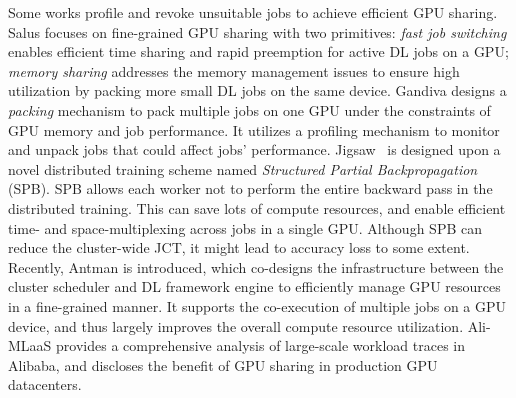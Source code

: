 Some works profile and revoke unsuitable jobs to achieve efficient GPU sharing. Salus \cite{Salus} focuses on fine-grained GPU sharing with two primitives: \emph{fast job switching} enables efficient time sharing and rapid preemption for active DL jobs on a GPU; \emph{memory sharing} addresses the memory management issues to ensure high utilization by packing more small DL jobs on the same device. Gandiva \cite{Gandiva} designs a \emph{packing} mechanism to pack multiple jobs on one GPU under the constraints of GPU memory and job performance. It utilizes a profiling mechanism to monitor and unpack jobs that could affect jobs’ performance. Jigsaw~\cite{JIGSAW} is designed upon a novel distributed training scheme named \emph{Structured Partial Backpropagation} (SPB). SPB allows each worker not to perform the entire backward pass in the distributed training. This can save lots of compute resources, and enable efficient time- and space-multiplexing across jobs in a single GPU.
Although SPB can reduce the cluster-wide JCT, it might lead to accuracy loss to some extent. Recently, Antman \cite{Antman} is introduced, which co-designs the infrastructure between the cluster scheduler and DL framework engine to efficiently manage GPU resources in a fine-grained manner. It supports the co-execution of multiple jobs on a GPU device, and thus largely improves the overall compute resource utilization. Ali-MLaaS \cite{MLaaS} provides a comprehensive analysis of large-scale workload traces in Alibaba, and discloses the benefit of GPU sharing in production GPU datacenters.

